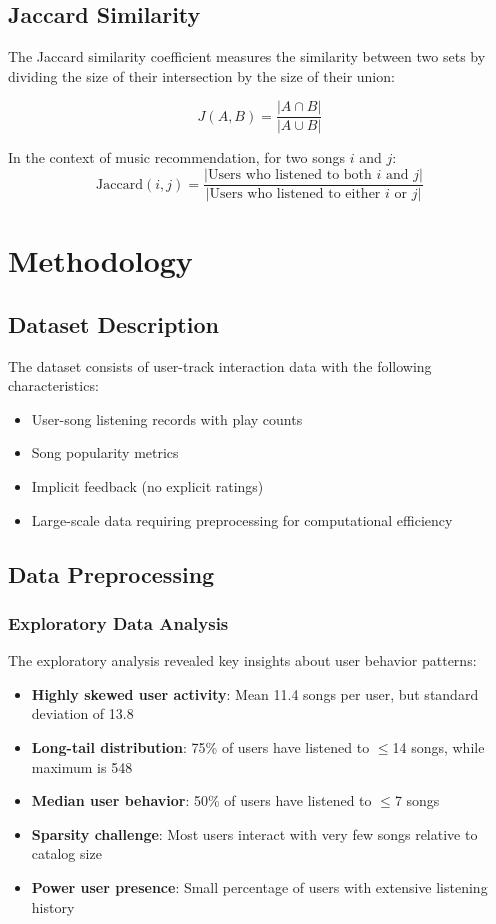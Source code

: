 \documentclass[12pt,a4paper]{article}
\begin{document}
\subsection{Jaccard Similarity}
The Jaccard similarity coefficient measures the similarity between two sets by dividing the size of their intersection by the size of their union:

\begin{equation}
J(A,B) = \frac{|A \cap B|}{|A \cup B|}
\end{equation}

In the context of music recommendation, for two songs $i$ and $j$:
\begin{equation}
\text{Jaccard}(i,j) = \frac{|\text{Users who listened to both } i \text{ and } j|}{|\text{Users who listened to either } i \text{ or } j|}
\end{equation}

\section{Methodology}

\subsection{Dataset Description}
The dataset consists of user-track interaction data with the following characteristics:
\begin{itemize}
    \item User-song listening records with play counts
    \item Song popularity metrics
    \item Implicit feedback (no explicit ratings)
    \item Large-scale data requiring preprocessing for computational efficiency
\end{itemize}

\subsection{Data Preprocessing}

\subsubsection{Exploratory Data Analysis}
The exploratory analysis revealed key insights about user behavior patterns:
\begin{itemize}
    \item \textbf{Highly skewed user activity}: Mean 11.4 songs per user, but standard deviation of 13.8
    \item \textbf{Long-tail distribution}: 75\% of users have listened to $\leq$14 songs, while maximum is 548
    \item \textbf{Median user behavior}: 50\% of users have listened to $\leq$7 songs
    \item \textbf{Sparsity challenge}: Most users interact with very few songs relative to catalog size
    \item \textbf{Power user presence}: Small percentage of users with extensive listening history
\end{itemize}
\end{document}

